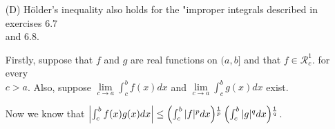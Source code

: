 \documentclass{book}
\newcommand{\pracOne}{
   \color{BrickRed}%
   \fontsize{13}{15}\selectfont%
}
\newcommand{\pracTwo}{
   \color{Orange}%
   \fontsize{12}{14}\selectfont%
}
\newenvironment{myIndent}{%
   \begin{adjustwidth}{2.5em}{0em}%
}{%
   \end{adjustwidth}%
}
\newenvironment{myTindent}{%
   \begin{adjustwidth}{7.5em}{0em}%
}{%
   \end{adjustwidth}%
}
\newcommand{\retTwo}{\hfill\bigbreak}
\begin{document}
\begin{itemize}
{\begin{myIndent}
      Now define $F(x) = \frac{1}{\left(\int_a^b|f|^p d\alpha\right)\hspace{-0.1em}\vphantom{b}^{\frac{1}{p}}}|f(x)|$ and $G(x) = \frac{1}{\left(\int_a^b|g|^q d\alpha\right)\hspace{-0.1em}\vphantom{b}^{\frac{1}{q}}}|g(x)|$.\retTwo

      Clearly, $\int_a^b Fd\alpha = 1 = \int_a^b Gd\alpha$. with $F, G \geq 0$ and $F, G \in \mathscr{R}_a^b$. So by part B,\\ we know that:

      {\center $\int_a^b FGd\alpha = \frac{1}{\left(\int_a^b|f|^p d\alpha\right)\hspace{-0.1em}\vphantom{b}^{\frac{1}{p}}}\cdot \frac{1}{\left(\int_a^b|g|^q d\alpha\right)\hspace{-0.1em}\vphantom{b}^{\frac{1}{q}}} \cdot \int_a^b|f||g|d\alpha \leq 1$ \retTwo\par}

      Then because $\left|\int_a^b fg d\alpha\right| \leq \int_a^b|fg|d\alpha = \int_a^b|f||g|d\alpha$, we can conclude that:

      {\centering $\left|\int_a^bfg d\alpha\right| \leq \left(\int_a^b|f|^p d\alpha\right)\hspace{-0.2em}\vphantom{b}^{\frac{1}{p}}\left(\int_a^b|g|^q d\alpha\right)\hspace{-0.2em}\vphantom{b}^{\frac{1}{q}}$ \retTwo\par}
      
      \begin{myTindent}\begin{myTindent}\pracOne
         Note: this is called \ul{Hölder's inequality}.\retTwo
      \end{myTindent}\end{myTindent}
   \end{myIndent}}

   \item[(D)] Hölder's inequality also holds for the "improper integrals described in exercises 6.7\\ and 6.8.
   
   {\begin{myIndent}\pracTwo
      Firstly, suppose that $f$ and $g$ are real functions on $(a, b]$ and that $f \in \mathscr{R}_c^1$. for every\\ $c > a$. Also, suppose $\lim\limits_{c\rightarrow a}\int_c^b f(x)dx$ and $\lim\limits_{c\rightarrow a}\int_c^b g(x)dx$ exist.\retTwo

      Now we know that $\left|\int_c^b f(x)g(x)dx\right| \leq \left(\int_c^b|f|^p dx\right)\hspace{-0.2em}\vphantom{b}^{\frac{1}{p}}\left(\int_c^b|g|^q dx\right)\hspace{-0.2em}\vphantom{b}^{\frac{1}{q}}$.\\


\end{myIndent}}
\end{itemize}
\end{document}
